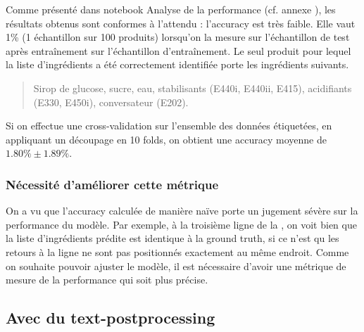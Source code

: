                 Comme présenté dans notebook \og Analyse de la performance \fg (cf. annexe ), les résultats obtenus sont conformes à l'attendu : l'accuracy est très faible.
                Elle vaut 1\% (1 échantillon sur 100 produits) lorsqu'on la mesure sur l'échantillon de test après entraînement sur l'échantillon d'entraînement.
                Le seul produit pour lequel la liste d'ingrédients a été correctement identifiée porte les ingrédients suivants.
                \begin{quotation}
                    Sirop de glucose, sucre, eau, stabilisants (E440i, E440ii, E415), acidifiants (E330, E450i), conversateur (E202).
                \end{quotation}
                Si on effectue une cross-validation sur l'ensemble des données étiquetées, en appliquant un découpage en 10 folds, on obtient une accuracy moyenne de $1.80\% \pm 1.89\%$.

                \subsubsection{Nécessité d'améliorer cette métrique}
                On a vu que l'accuracy calculée de manière naïve porte un jugement sévère sur la performance du modèle.
                Par exemple, à la troisième ligne de la , on voit bien que la liste d'ingrédients prédite est identique à la ground truth, si ce n'est qu les retours à la ligne ne sont pas positionnés exactement au même endroit.
                Comme on souhaite pouvoir ajuster le modèle, il est nécessaire d'avoir une métrique de mesure de la performance qui soit plus précise.

            \subsection{Avec du \og text-postprocessing \fg}
            \label{text_postprocessing}

